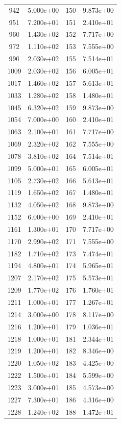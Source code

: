 \documentclass[12pt]{article}
\begin{document}
\begin{longtable}{@{}cccc@{}}
942 & 5.000e+00 & 150 & 9.873e+00 \\
951 & 7.200e+01 & 151 & 2.410e+01 \\
960 & 1.430e+02 & 152 & 7.717e+00 \\
972 & 1.110e+02 & 153 & 7.555e+00 \\
990 & 2.030e+02 & 155 & 7.514e+01 \\
1009 & 2.030e+02 & 156 & 6.005e+01 \\
1017 & 1.460e+02 & 157 & 5.613e+01 \\
1033 & 1.280e+02 & 158 & 1.480e+01 \\
1045 & 6.320e+02 & 159 & 9.873e+00 \\
1054 & 7.000e+00 & 160 & 2.410e+01 \\
1063 & 2.100e+01 & 161 & 7.717e+00 \\
1069 & 2.320e+02 & 162 & 7.555e+00 \\
1078 & 3.810e+02 & 164 & 7.514e+01 \\
1099 & 5.000e+01 & 165 & 6.005e+01 \\
1105 & 2.730e+02 & 166 & 5.613e+01 \\
1119 & 1.650e+02 & 167 & 1.480e+01 \\
1132 & 4.050e+02 & 168 & 9.873e+00 \\
1152 & 6.000e+00 & 169 & 2.410e+01 \\
1161 & 1.300e+01 & 170 & 7.717e+00 \\
1170 & 2.990e+02 & 171 & 7.555e+00 \\
1182 & 1.710e+02 & 173 & 7.474e+01 \\
1194 & 4.800e+01 & 174 & 5.965e+01 \\
1207 & 2.170e+02 & 175 & 5.573e+01 \\
1209 & 1.770e+02 & 176 & 1.760e+01 \\
1211 & 1.000e+01 & 177 & 1.267e+01 \\
1214 & 3.000e+00 & 178 & 8.117e+00 \\
1216 & 1.200e+01 & 179 & 1.036e+01 \\
1218 & 1.000e+01 & 181 & 2.344e+01 \\
1219 & 1.200e+01 & 182 & 8.346e+00 \\
1220 & 1.050e+02 & 183 & 4.425e+00 \\
1222 & 1.500e+01 & 184 & 5.599e+00 \\
1223 & 3.000e+01 & 185 & 4.573e+00 \\
1227 & 7.300e+01 & 186 & 4.316e+00 \\
1228 & 1.240e+02 & 188 & 1.472e+01 \\

\end{longtable}
\end{document}
